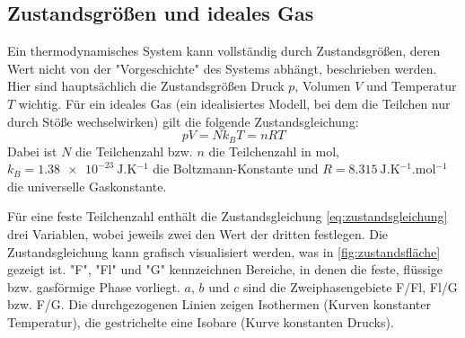 \subsection{Zustandsgrößen und ideales Gas}
Ein thermodynamisches System kann vollständig durch Zustandsgrößen, deren Wert nicht von der "Vorgeschichte" des Systems abhängt, beschrieben werden. Hier sind hauptsächlich die Zustandsgrößen Druck $p$, Volumen $V$ und Temperatur $T$ wichtig.
Für ein ideales Gas (ein idealisiertes Modell, bei dem die Teilchen nur durch Stöße wechselwirken) gilt die folgende Zustandsgleichung:
\begin{equation}\label{eq:zustandsgleichung}
p V = N k_B T = n R T
\end{equation}
Dabei ist $N$ die Teilchenzahl bzw. $n$ die Teilchenzahl in \si{\mol}, $k_B = \SI{1,38e-23}{\J.\K^{-1}}$ die Boltzmann-Konstante und $R = \SI{8,315}{\J.\K^{-1}.\mol^{-1}}$ die universelle Gaskonstante.

Für eine feste Teilchenzahl enthält die Zustandsgleichung \cref{eq:zustandsgleichung} drei Variablen, wobei jeweils zwei den Wert der dritten festlegen.
Die Zustandsgleichung
kann grafisch visualisiert werden, was in \cref{fig:zustandsfläche} gezeigt ist.
"F", "Fl" und "G" kennzeichnen Bereiche, in denen die feste, flüssige bzw. gasförmige Phase vorliegt. $a$, $b$ und $c$ sind die Zweiphasengebiete F/Fl, Fl/G bzw. F/G. Die durchgezogenen Linien zeigen Isothermen (Kurven konstanter Temperatur), die gestrichelte eine Isobare (Kurve konstanten Drucks).

